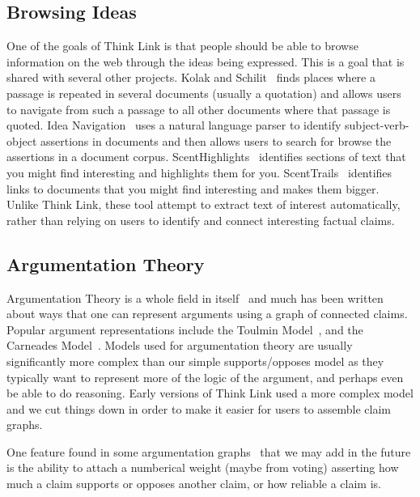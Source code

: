 \documentclass{chi2009}
\begin{document}
\subsection{Browsing Ideas}

One of the goals of Think Link is that people should be able to browse information on the web through the ideas being expressed. This is a goal that is shared with several other projects. Kolak and Schilit~\cite{quotations,quotationsdl} finds places where a passage is repeated in several documents (usually a quotation) and allows users to navigate from such a passage to all other documents where that passage is quoted. Idea Navigation~\cite{ideanavigation} uses a natural language parser to identify subject-verb-object assertions in documents and then allows users to search for browse the assertions in a document corpus. ScentHighlights~\cite{scenthighlights} identifies sections of text that you might find interesting and highlights them for you. ScentTrails~\cite{scenttrails} identifies links to documents that you might find interesting and makes them bigger. Unlike Think Link, these tool attempt to extract text of interest automatically, rather than relying on users to identify and connect interesting factual claims.


\subsection{Argumentation Theory}

Argumentation Theory is a whole field in itself~\cite{argumentation,argmas} and much has been written about ways that one can represent arguments using a graph of connected claims. Popular argument representations include the Toulmin Model~\cite{toulmin}, and the Carneades Model~\cite{carneades}. Models used for argumentation theory are usually significantly more complex than our simple supports/opposes model as they typically want to represent more of the logic of the argument, and perhaps even be able to do reasoning. Early versions of Think Link used a more complex model and we cut things down in order to make it easier for users to assemble claim graphs.

One feature found in some argumentation graphs~\cite{Korb97acognitive} that we may add in the future is the ability to attach a numberical weight (maybe from voting) asserting how much a claim supports or opposes another claim, or how reliable a claim is.
\end{document}
